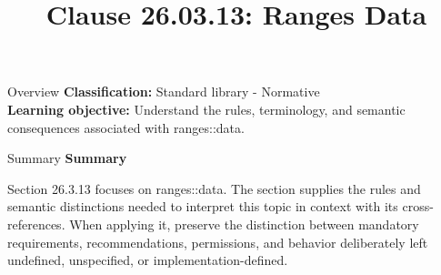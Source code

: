 \documentclass[10pt,letterpaper]{article}
\title{Clause 26.03.13: Ranges Data}
\author{}
\date{}
\begin{document}
\maketitle
\begin{CornellOverviewBox}{Overview}
\textbf{Classification:} Standard library - Normative\\[2pt]
\textbf{Learning objective:} Understand the rules, terminology, and semantic consequences associated with ranges::data.
\end{CornellOverviewBox}\begin{CornellSummaryBox}{Summary}
{\sffamily\bfseries\color{Accent} Summary}\par\vspace{3pt}Section 26.3.13 focuses on ranges::data. The section supplies the rules and semantic distinctions needed to interpret this topic in context with its cross-references. When applying it, preserve the distinction between mandatory requirements, recommendations, permissions, and behavior deliberately left undefined, unspecified, or implementation-defined.
\end{CornellSummaryBox}
\end{document}
